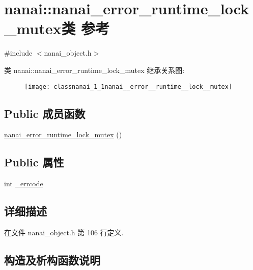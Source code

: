 \hypertarget{classnanai_1_1nanai__error__runtime__lock__mutex}{}\section{nanai\+:\+:nanai\+\_\+error\+\_\+runtime\+\_\+lock\+\_\+mutex类 参考}
\label{classnanai_1_1nanai__error__runtime__lock__mutex}


{\ttfamily \#include $<$nanai\+\_\+object.\+h$>$}

类 nanai\+:\+:nanai\+\_\+error\+\_\+runtime\+\_\+lock\+\_\+mutex 继承关系图\+:\begin{figure}[H]
\begin{center}
\leavevmode
\texttt{[image: classnanai\_1\_1nanai\_\_error\_\_runtime\_\_lock\_\_mutex]}
\end{center}
\end{figure}
\subsection*{Public 成员函数}
\begin{DoxyCompactItemize}
\item 
\hyperlink{classnanai_1_1nanai__error__runtime__lock__mutex_ab4db66d8a33d10c1cfffc880adba1d2f}{nanai\+\_\+error\+\_\+runtime\+\_\+lock\+\_\+mutex} ()
\end{DoxyCompactItemize}
\subsection*{Public 属性}
\begin{DoxyCompactItemize}
\item 
int \hyperlink{classnanai_1_1nanai__error__runtime__lock__mutex_ab01eae05d07fbef9dc8badb4d9aa1b05}{\+\_\+errcode}
\end{DoxyCompactItemize}


\subsection{详细描述}


在文件 nanai\+\_\+object.\+h 第 106 行定义.



\subsection{构造及析构函数说明}
\hypertarget{classnanai_1_1nanai__error__runtime__lock__mutex_ab4db66d8a33d10c1cfffc880adba1d2f}{}
